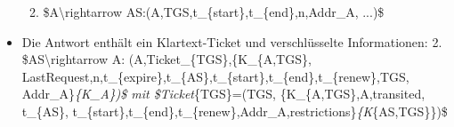 \documentclass[a4paper]{article}
\begin{document}
\begin{multicols}{3}
\begin{itemize}
              \begin{enumerate}
                  \def\labelenumi{\arabic{enumi}.}
                  \item
                        \$A\textbackslash rightarrow
                        AS:(A,TGS,t\_\{start\},t\_\{end\},n,Addr\_A, ...)\$
              \end{enumerate}
        \item
              Die Antwort enthält ein Klartext-Ticket und verschlüsselte
              Informationen: 2. \$AS\textbackslash rightarrow A:
              (A,Ticket\_\{TGS\},\{K\_\{A,TGS\},
              LastRequest,n,t\_\{expire\},t\_\{AS\},t\_\{start\},t\_\{end\},t\_\{renew\},TGS,
              Addr\_A\}\emph{\{K\_A\})\$ mit \$Ticket}\{TGS\}=(TGS,
              \{K\_\{A,TGS\},A,transited, t\_\{AS\},
              t\_\{start\},t\_\{end\},t\_\{renew\},Addr\_A,restrictions\}\emph{\{K}\{AS,TGS\}\})\$


\end{itemize}
\end{multicols}
\end{document}

